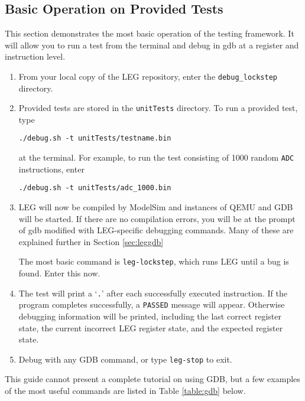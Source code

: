 \subsection{Basic Operation on Provided Tests}
This section demonstrates the most basic operation of the testing framework.
It will allow you to run a test from the terminal and debug in gdb at a register and instruction level.
\begin{enumerate}
\item From your local copy of the LEG repository, enter the \texttt{debug\_lockstep} directory.
\item Provided tests are stored in the \texttt{unitTests} directory. 
 To run a provided test, type 
 \begin{verbatim}./debug.sh -t unitTests/testname.bin\end{verbatim}
 at the terminal. For example, to run the test consisting of 1000 random \texttt{ADC} instructions, enter 
 \begin{verbatim}./debug.sh -t unitTests/adc_1000.bin\end{verbatim}
\item LEG will now be compiled by ModelSim and instances of QEMU and GDB will be started.
 If there are no compilation errors, you will be at the prompt of gdb modified with LEG-specific debugging commands.
 Many of these are explained further in Section \ref{sec:leggdb}
 
 The most basic command is \texttt{leg-lockstep}, which runs LEG until a bug is found.
 Enter this now.
\item The test will print a `\texttt{.}' after each successfully executed instruction.
 If the program completes successfully, a \texttt{PASSED} message will appear.
 Otherwise debugging information will be printed, including the last correct register state, the current incorrect LEG register state, and the expected register state.
\item Debug with any GDB command, or type \texttt{leg-stop} to exit.
\end{enumerate}

This guide cannot present a complete tutorial on using GDB, but a few examples of the most useful commands are listed in Table \ref{table:gdb} below.

